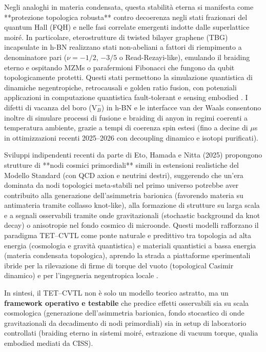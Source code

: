\documentclass[11pt,a4paper]{article}
\let\oldcite\cite
\renewcommand{\cite}{\protect\oldcite}
\theoremstyle{plain}
\theoremstyle{definition}
\begin{document}
Negli analoghi in materia condensata, questa stabilità eterna si manifesta come **protezione topologica robusta** contro decoerenza negli stati frazionari del quantum Hall (FQH) e nelle fasi correlate emergenti indotte dalle superlattice moiré. In particolare, eterostrutture di twisted bilayer graphene (TBG) incapsulate in h-BN realizzano stati non-abeliani a fattori di riempimento a denominatore pari ($\nu = -1/2$, $-3/5$ o Read-Rezayi-like), emulando il braiding eterno e ospitando MZMs o parafermioni Fibonacci che fungono da qubit topologicamente protetti. Questi stati permettono la simulazione quantistica di dinamiche negentropiche, retrocausali e golden ratio fusion, con potenziali applicazioni in computazione quantistica fault-tolerant e sensing embodied \cite{PhysSoliman2026NV}. I difetti di vacanza del boro ($\mathrm{V}_B^-$) in h-BN e le interfacce van der Waals consentono inoltre di simulare processi di fusione e braiding di anyon in regimi coerenti a temperatura ambiente, grazie a tempi di coerenza spin estesi (fino a decine di $\mu$s in ottimizzazioni recenti 2025–2026 con decoupling dinamico e isotopi purificati).

Sviluppi indipendenti recenti da parte di Eto, Hamada e Nitta (2025) propongono strutture di **nodi cosmici primordiali** simili in estensioni realistiche del Modello Standard (con QCD axion e neutrini destri), suggerendo che un'era dominata da nodi topologici meta-stabili nel primo universo potrebbe aver contribuito alla generazione dell'asimmetria barionica (favorendo materia su antimateria tramite collasso knot-like), alla formazione di strutture su larga scala e a segnali osservabili tramite onde gravitazionali (stochastic background da knot decay) o anisotropie nel fondo cosmico di microonde. Questi modelli rafforzano il paradigma TET--CVTL come ponte naturale e predittivo tra topologia ad alta energia (cosmologia e gravità quantistica) e materiali quantistici a bassa energia (materia condensata topologica), aprendo la strada a piattaforme sperimentali ibride per la rilevazione di firme di torque del vuoto (topological Casimir dinamico) e per l'ingegneria negentropica locale \cite{PhysSoliman2026Eternal, PhysSoliman2026PrimordialTrefoil, PhysSoliman2026TUGUTSYSY}.

In sintesi, il TET--CVTL non è solo un modello teorico astratto, ma un \textbf{framework operativo e testabile} che predice effetti osservabili sia su scala cosmologica (generazione dell'asimmetria barionica, fondo stocastico di onde gravitazionali da decadimento di nodi primordiali) sia in setup di laboratorio controllati (braiding eterno in sistemi moiré, estrazione di vacuum torque, qualia embodied mediati da CISS). 
\end{document}
